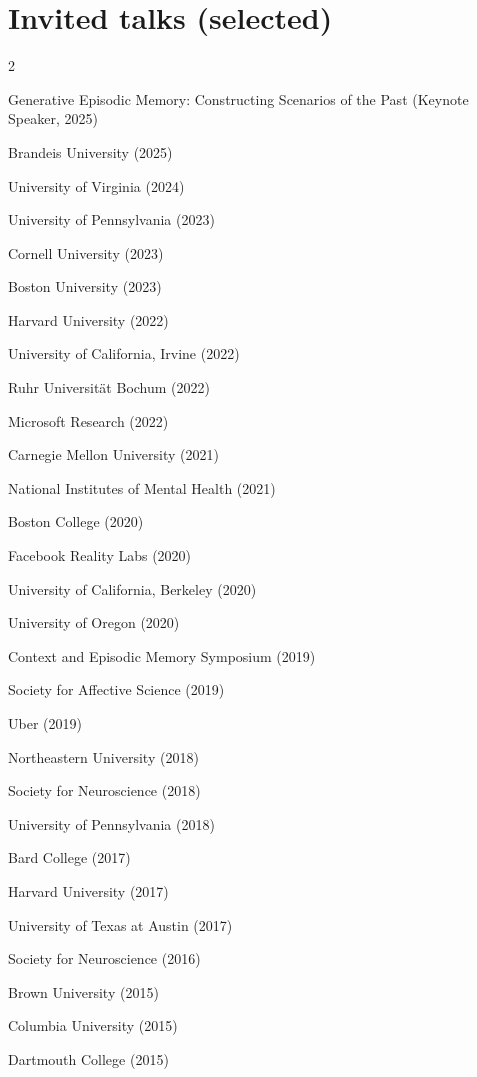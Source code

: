 \documentclass[11pt, a4paper]{article} %
\begin{document}
\section*{Invited talks (selected)}

\begin{multicols}{2}
\begin{etaremune}
\item Generative Episodic Memory: Constructing Scenarios of the Past (Keynote Speaker, 2025)
\item Brandeis University (2025)
\item University of Virginia (2024)
\item University of Pennsylvania (2023)
\item Cornell University (2023)
\item Boston University (2023)
\item Harvard University (2022)
\item University of California, Irvine (2022)
\item Ruhr Universit\"{a}t Bochum (2022)
\item Microsoft Research (2022)
\item Carnegie Mellon University (2021)
\item National Institutes of Mental Health (2021)
\item Boston College (2020)
\item Facebook Reality Labs (2020)
\item University of California, Berkeley (2020)
\item University of Oregon (2020)
\item Context and Episodic Memory Symposium (2019)
\item Society for Affective Science (2019)
\item Uber (2019)
\item Northeastern University (2018)
\item Society for Neuroscience (2018)
\item University of Pennsylvania (2018)
\item Bard College (2017)
\item Harvard University (2017)
\item University of Texas at Austin (2017)
\item Society for Neuroscience (2016)
\item Brown University (2015)
\item Columbia University (2015)
\item Dartmouth College (2015)

\end{etaremune}
\end{multicols}
\end{document}
